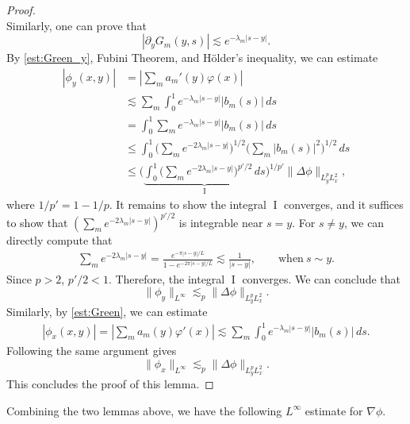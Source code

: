 \documentclass[reqno, 11pt]{amsart}
\theoremstyle{plain}
\theoremstyle{definition}
\theoremstyle{remark}
\newcommand{\I}{\operatorname{I}}
\numberwithin{equation}{section}
\begin{document}
\begin{proof}
$$$$
Similarly, one can prove that
\begin{equation}\label{est:Green_y}
|\partial_y G_m(y,s)| \lesssim e^{- \lambda_m |s-y|}.
\end{equation}
By \eqref{est:Green_y}, Fubini Theorem, and H\"older's inequality, we can estimate 
\begin{align*}
|\phi_y(x,y)| &= \left| \sum_m a_m'(y) \varphi(x) \right|\\
& \lesssim \sum_m \int_0^1 e^{- \lambda_m |s-y|} |b_m(s)| \, ds\\
&= \int_0^1 \sum_m e^{- \lambda_m |s-y|} |b_m(s)| \, ds\\
&\le \int_0^1 \Big( \sum_m e^{- 2\lambda_m |s-y|} \Big)^{1/2} \Big( \sum_m |b_m(s)|^2 \Big)^{1/2}\, ds\\
&\le \Bigg( \underbrace{\int_0^1 \Big( \sum_m e^{- 2\lambda_m |s-y|}\Big)^{p'/2} \, ds}_{\I}  \Bigg)^{1/p'} \| \Delta \phi\|_{L^p_y L^2_x},
\end{align*}
where $1/p' = 1 - 1/p$. It remains to show the integral $\I$ converges, and it suffices to show that $( \sum_m e^{- 2\lambda_m |s-y|})^{p'/2}$ is integrable near $s = y$. For $s \neq y$, we can directly compute that
\begin{align*}
 \sum_m e^{- 2\lambda_m |s-y|} = \frac{e^{- \pi|s-y|/L}}{1 - e^{-2\pi|s-y|/L}} \lesssim \frac{1}{|s-y|}, \qquad \mbox{when}~s \sim y.
\end{align*}
Since $p > 2$, $p'/2 < 1$. Therefore, the integral $\I$ converges. We can conclude that
$$
\|\phi_y\|_{L^\infty} \lesssim_p  \| \Delta \phi\|_{L^p_y L^2_x}.
$$
Similarly, by \eqref{est:Green}, we can estimate
\begin{align*}
|\phi_x(x,y)| = \left| \sum_m a_m(y) \varphi'(x) \right| \lesssim \sum_m \int_0^1 e^{- \lambda_m |s-y|} |b_m(s)| \, ds.
\end{align*}
Following the same argument gives
$$
\|\phi_x\|_{L^\infty} \lesssim_p  \| \Delta \phi\|_{L^p_y L^2_x}.
$$
This concludes the proof of this lemma.
\end{proof}

Combining the two lemmas above, we have the following $L^\infty$ estimate for $\nabla \phi$.
\end{document}
